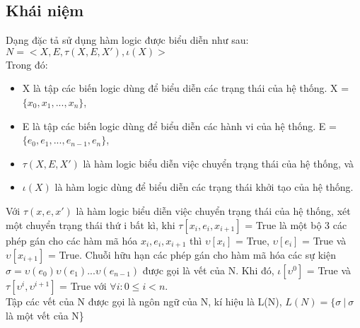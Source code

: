 \documentclass[a4paper,13pt,oneside,openany]{book}
\begin{document}
\begin{flushleft}
		\subsection{Khái niệm}
		Dạng đặc tả sử dụng hàm logic được biểu diễn như sau: \\
				$N = <X, E, \tau(X, E, X'), \iota(X)>$\\
				Trong đó:\\
				\begin{itemize}
					\item X là tập các biến logic dùng để biểu diễn các trạng thái của hệ thống. X = $\{x_0, x_1, ..., x_n\}$,
					\item E là tập các biến logic dùng để biểu diễn các hành vi của hệ thống. E = $\{e_0, e_1, ..., e_{n-1}, e_n\}$,
					\item $\tau(X, E, X')$ là hàm logic biểu diễn việc chuyển trạng thái của hệ thống, và
					\item $\iota(X)$ là hàm logic dùng để biểu diễn các trạng thái khởi tạo của hệ thống.
				\end{itemize}
				Với $\tau(x, e, x')$ là hàm logic biểu diễn việc chuyển trạng thái của hệ thống, xét một chuyển trạng thái thứ i bất kì, khi $\tau[x_i, e_i, x_{i+1}]$ = True là một bộ 3 các phép gán cho các hàm mã hóa $x_i, e_i, x_{i+1}$ thì $\upsilon[x_i]$ = True, $\upsilon[e_i]$ = True và $\upsilon[x_{i+1}]$ = True. Chuỗi hữu hạn các phép gán cho hàm mã hóa các sự kiện $\sigma = \upsilon(e_0)\upsilon(e_1)...\upsilon(e_{n-1})$ được gọi là vết của N. Khi đó, $\iota[\upsilon^0]$ = True và $\tau[\upsilon^i, \upsilon^{i+1}]$ = True với $\forall i: 0 \leq i < n$.\\
				Tập các vết của N được gọi là ngôn ngữ của N, kí hiệu là L(N), $L(N) = \{\sigma\ |\ \sigma$ là một vết của N\}\\

\end{flushleft}
\end{document}
